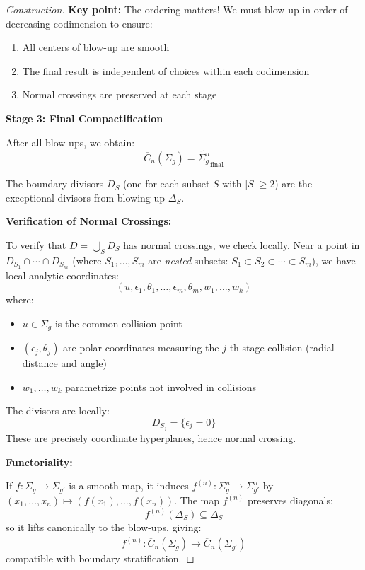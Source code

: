 \begin{proof}[Construction]
\textbf{Key point:} The ordering matters! We must blow up in order of decreasing codimension to ensure:
\begin{enumerate}
\item All centers of blow-up are smooth
\item The final result is independent of choices within each codimension
\item Normal crossings are preserved at each stage
\end{enumerate}

\medskip
\noindent\textbf{Stage 3: Final Compactification}

After all blow-ups, we obtain:
$$\overline{C}_n(\Sigma_g) = \widetilde{\Sigma_g^n}_{\text{final}}$$

The boundary divisors $D_S$ (one for each subset $S$ with $|S| \geq 2$) are the exceptional divisors from blowing up $\Delta_S$. 

\medskip
\noindent\textbf{Verification of Normal Crossings:}

To verify that $D = \bigcup_S D_S$ has normal crossings, we check locally. Near a point in $D_{S_1} \cap \cdots \cap D_{S_m}$ (where $S_1, \ldots, S_m$ are \emph{nested} subsets: $S_1 \subset S_2 \subset \cdots \subset S_m$), we have local analytic coordinates:
$$(u, \epsilon_1, \theta_1, \ldots, \epsilon_m, \theta_m, w_1, \ldots, w_k)$$
where:
\begin{itemize}
\item $u \in \Sigma_g$ is the common collision point
\item $(\epsilon_j, \theta_j)$ are polar coordinates measuring the $j$-th stage collision (radial distance and angle)
\item $w_1, \ldots, w_k$ parametrize points not involved in collisions
\end{itemize}

The divisors are locally:
$$D_{S_j} = \{\epsilon_j = 0\}$$
These are precisely coordinate hyperplanes, hence normal crossing.

\medskip
\noindent\textbf{Functoriality:}

If $f: \Sigma_g \to \Sigma_{g'}$ is a smooth map, it induces $f^{(n)}: \Sigma_g^n \to \Sigma_{g'}^n$ by $(x_1,\ldots,x_n) \mapsto (f(x_1),\ldots,f(x_n))$. The map $f^{(n)}$ preserves diagonals:
$$f^{(n)}(\Delta_S) \subseteq \Delta_S$$
so it lifts canonically to the blow-ups, giving:
$$\overline{f^{(n)}}: \overline{C}_n(\Sigma_g) \to \overline{C}_n(\Sigma_{g'})$$
compatible with boundary stratification.
\end{proof}

